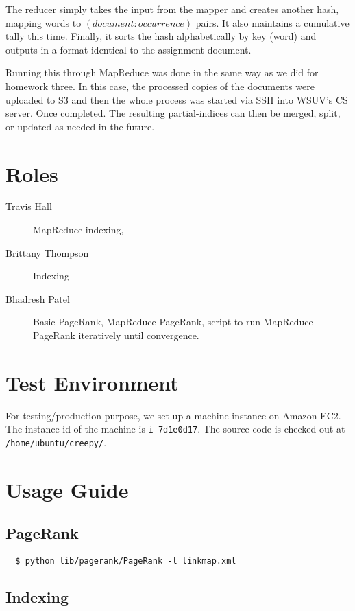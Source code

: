 \documentclass[letterpaper,11pt,twoside]{article}
\begin{document}
The reducer simply takes the input from the mapper and creates another hash, mapping words to $(document:occurrence)$ pairs. It also maintains a cumulative tally this time. Finally, it sorts the hash alphabetically by key (word) and outputs in a format identical to the assignment document.

Running this through MapReduce was done in the same way as we did for homework three. In this case, the processed copies of the documents were uploaded to S3 and then the whole process was started via SSH into WSUV's CS server. Once completed. The resulting partial-indices can then be merged, split, or updated as needed in the future.

\section{Roles}
\begin{description}
 \item[Travis Hall] MapReduce indexing,
 \item[Brittany Thompson] Indexing
 \item[Bhadresh Patel] Basic PageRank, MapReduce PageRank, script to run MapReduce PageRank iteratively until convergence.
\end{description}

\section{Test Environment}
For testing/production purpose, we set up a machine instance on Amazon EC2. The instance id of the machine is \texttt{i-7d1e0d17}. The source code is checked out at \texttt{/home/ubuntu/creepy/}.

\section{Usage Guide}

\subsection{PageRank}
\begin{verbatim}
  $ python lib/pagerank/PageRank -l linkmap.xml
\end{verbatim}
	
\subsection{Indexing}
\end{document}
